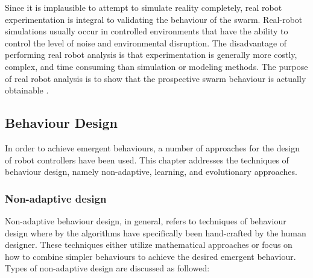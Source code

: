 Since it is implausible to attempt to simulate reality completely, real robot experimentation is integral to validating the behaviour of the swarm. Real-robot simulations usually occur in controlled environments that have the ability to control the level of noise and environmental disruption. 
The disadvantage of performing real robot analysis is that experimentation is generally more costly, complex, and time consuming than simulation or modeling methods. The purpose of real robot analysis is to show that the prospective swarm behaviour is actually obtainable \cite{brambilla2013swarm}.

\subsection{Behaviour Design}

In order to achieve emergent behaviours, a number of approaches for the design of robot controllers have been used. This chapter addresses the techniques of behaviour design, namely non-adaptive, learning, and evolutionary approaches.

\subsubsection{Non-adaptive design}
Non-adaptive behaviour design, in general, refers to techniques of behaviour design where by the algorithms have specifically been hand-crafted by the human designer. These techniques either utilize mathematical approaches or focus on how to combine simpler behaviours to achieve the desired emergent behaviour. Types of non-adaptive design are discussed as followed: 

